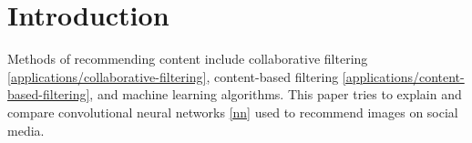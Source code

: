 \section{Introduction} \label{introduction}

  Methods of recommending content include collaborative filtering \ref{applications/collaborative-filtering}, content-based filtering \ref{applications/content-based-filtering}, and machine learning algorithms.\cite{10142790} This paper tries to explain and compare convolutional neural networks \ref{nn} used to recommend images on social media.

